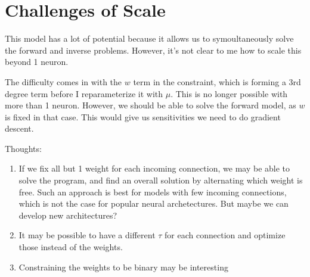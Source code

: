 \documentclass[a4paper]{article}
\begin{document}
\section{Challenges of Scale}

This model has a lot of potential because it allows us to symoultaneously solve the forward and inverse problems. However, it's not clear to me how to scale this beyond 1 neuron.

The difficulty comes in with the $w$ term in the constraint, which is forming a 3rd degree term before I reparameterize it with $\mu$. This is no longer possible with more than 1 neuron. However, we should be able to solve the forward model, as $w$ is fixed in that case. This would give us sensitivities we need to do gradient descent.

Thoughts:

\begin{enumerate}
    \item If we fix all but 1 weight for each incoming connection, we may be able to solve the program, and find an overall solution by alternating which weight is free. Such an approach is best for models with few incoming connections, which is not the case for popular neural archetectures. But maybe we can develop new architectures?
    \item It may be possible to have a different $\tau$ for each connection and optimize those instead of the weights.
    \item Constraining the weights to be binary may be interesting
\end{enumerate}
\end{document}
